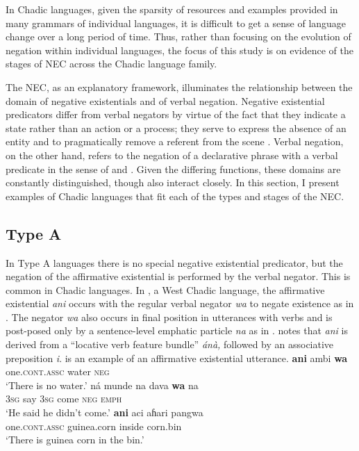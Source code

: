 \documentclass[output=paper]{langsci/langscibook}
\begin{document}
In Chadic languages, given the sparsity of resources and examples provided
in many grammars of individual languages, it is difficult to get a sense of
language change over a long period of time. Thus, rather than focusing on
the evolution of negation within individual languages, the focus of this
study is on evidence of the stages of NEC across the Chadic language
family. 

The NEC, as an explanatory framework, illuminates the relationship between
the domain of negative existentials and of verbal negation. Negative
existential predicators differ from verbal negators by virtue of the fact
that they indicate a state rather than an action or a process; they serve
to express the absence of an entity and to pragmatically remove a referent
from the scene \citep{Veselinova2013}. Verbal negation, on the other hand,
refers to the negation of a declarative phrase with a verbal predicate in the
sense of \citet{Dahl2010} and \citet{Miestamo2005}. Given the differing
functions, these domains are constantly distinguished, though also interact
closely. In this section, I present examples of Chadic languages that
fit each of the types and stages of the NEC.

\subsection{Type A}\label{sec:3:3.1}

In Type A languages there is no special negative existential predicator,
but the negation of the affirmative existential is performed by the verbal
negator. This is common in Chadic languages. In , a West
Chadic language, the affirmative existential \textit{ani} occurs with the
regular verbal negator \textit{wa} to negate existence as in
.  The negator \textit{wa} also occurs in final
position in utterances with verbs and is post-posed only by a
sentence-level emphatic particle \textit{na} as in .
\citet[102]{Skinner1979} notes that \textit{ani} is derived from a
``locative verb feature bundle'' \textit{\'an\`a,} followed by an
associative preposition \textit{i}.  is an example of
an affirmative existential utterance.  
\ea\label{ex:paanci-water-come-corn}
\ea\label{ex:paanci-water} 
\gll \textbf{ani} ambi \textbf{wa}\\ 
one.\textsc{cont.assc} water \textsc{neg}\\
\glt `There is no water.'{\footnotemark} 
\ex\label{ex:paanci-come} 
\gll n\'a munde na dava \textbf{wa} na\\ 
3\textsc{sg} say 3\textsc{sg} come \textsc{neg} \textsc{emph}\\ 
\glt `He said he didn't come.' 
\ex\label{ex:paanci-corn}
\gll \textbf{ani} aci aɦari pangwa\\ 
one.\textsc{cont.assc} guinea.corn inside corn.bin\\ 
\glt `There is guinea corn in the bin.' \z\z
\end{document}
